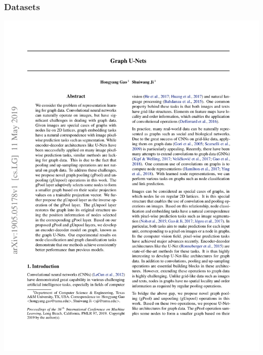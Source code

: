 \documentclass[12pt,aspectratio=169]{beamer}
\begin{document}
    \begin{frame}
        \frametitle{Datasets}

        \centering
        \includegraphics[page=6,trim=1cm 18.5cm 1cm 2.5cm,clip,scale=0.7]{Graph U-Net.pdf}
    \end{frame}
\end{document}
